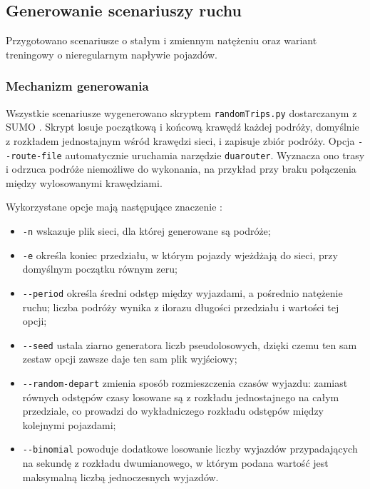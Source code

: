\subsection{Generowanie scenariuszy ruchu}
\label{subsec:generowanie-scenariuszy}

Przygotowano scenariusze o stałym i zmiennym natężeniu oraz wariant treningowy o nieregularnym napływie pojazdów.

\subsubsection{Mechanizm generowania}
\label{subsubsec:mechanizm-generowania}

{\setlength{\emergencystretch}{1em}
Wszystkie scenariusze wygenerowano skryptem \texttt{randomTrips.py} dostarczanym z SUMO \cite{sumo_randomtrips_docs}. Skrypt losuje początkową i końcową krawędź każdej podróży, domyślnie z rozkładem jednostajnym wśród krawędzi sieci, i zapisuje zbiór podróży. Opcja \texttt{-{}-route-file} automatycznie uruchamia narzędzie \texttt{duarouter}. Wyznacza ono trasy i odrzuca podróże niemożliwe do wykonania, na przykład przy braku połączenia między wylosowanymi krawędziami.\par}

Wykorzystane opcje mają następujące znaczenie \cite{sumo_randomtrips_docs}:
\begin{itemize}
    \item \texttt{-n} wskazuje plik sieci, dla której generowane są podróże;
    \item \texttt{-e} określa koniec przedziału, w którym pojazdy wjeżdżają do sieci, przy domyślnym początku równym zeru;
    \item \texttt{-{}-period} określa średni odstęp między wyjazdami, a pośrednio natężenie ruchu; liczba podróży wynika z ilorazu długości przedziału i wartości tej opcji;
    \item \texttt{-{}-seed} ustala ziarno generatora liczb pseudolosowych, dzięki czemu ten sam zestaw opcji zawsze daje ten sam plik wyjściowy;
    \item \texttt{-{}-random-depart} zmienia sposób rozmieszczenia czasów wyjazdu: zamiast równych odstępów czasy losowane są z rozkładu jednostajnego na całym przedziale, co prowadzi do wykładniczego rozkładu odstępów między kolejnymi pojazdami;
    \item \texttt{-{}-binomial} powoduje dodatkowe losowanie liczby wyjazdów przypadających na sekundę z rozkładu dwumianowego, w którym podana wartość jest maksymalną liczbą jednoczesnych wyjazdów.
\end{itemize}

